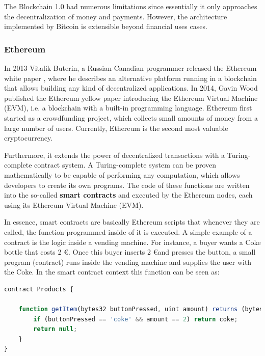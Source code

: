 The Blockchain 1.0 had numerous limitations since essentially it only approaches the decentralization of money and payments. However, the architecture implemented by Bitcoin is extensible beyond financial uses cases.

\subsubsection{Ethereum}

In 2013 Vitalik Buterin, a Russian-Canadian programmer released the Ethereum white paper \cite{buterin2014next}, where he describes an alternative platform running in a blockchain that allows building any kind of decentralized applications. In 2014, Gavin Wood published the Ethereum
yellow paper introducing the Ethereum Virtual Machine (EVM), i.e. a blockchain with a built-in programming language. Ethereum first started as a crowdfunding project, which collects small amounts of money from a large number of users. Currently, Ethereum is the second most valuable cryptocurrency.

Furthermore, it extends the power of decentralized transactions with a Turing-complete contract system. A Turing-complete system can be proven mathematically to be capable of performing any computation, which allows developers to create its own programs. The code of these functions are written into the so-called \textbf{smart contracts} and executed by the Ethereum nodes, each using its Ethereum Virtual Machine (EVM).

In essence, smart contracts are basically Ethereum scripts that whenever they are called, the function programmed inside of it is executed. A simple example of a contract is the logic inside a vending machine. For instance, a buyer wants a Coke bottle that costs 2 \euro. Once this buyer inserts 2 \euro and presses the button, a small program (contract) runs inside the vending machine and supplies the user with the Coke. In the smart contract context this function can be seen as:
\newline

\begin{lstlisting}[language=JavaScript,caption={Example of an Ethereum contract simulating a vending machine. The defined function returns a bottle of Coke if 2 \euro are inserted.},label={lst:CokeExample}]
contract Products {

	function getItem(bytes32 buttonPressed, uint amount) returns (bytes32 item) {
		if (buttonPressed == 'coke' && amount == 2) return coke;
 		return null;
	}
}
\end{lstlisting}

